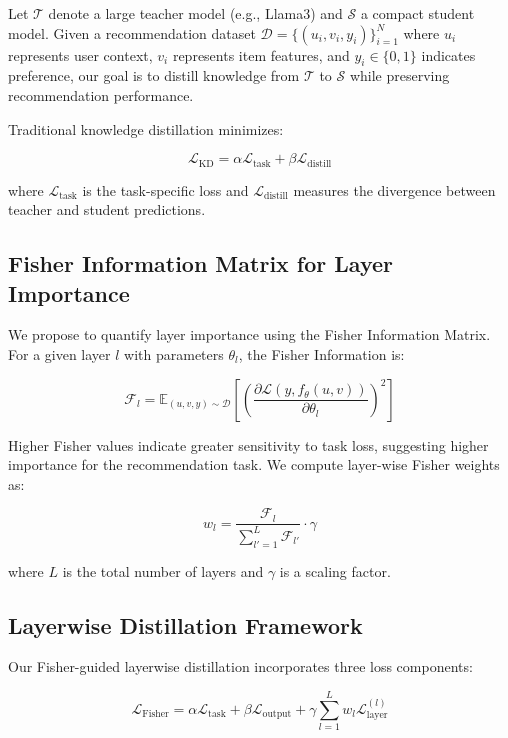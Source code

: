 \documentclass[10pt,conference]{IEEEtran}
\newcommand{\fisher}{\mathcal{F}}
\newcommand{\loss}{\mathcal{L}}
\newcommand{\student}{\mathcal{S}}
\newcommand{\teacher}{\mathcal{T}}
\begin{document}
Let $\teacher$ denote a large teacher model (e.g., Llama3) and $\student$ a compact student model. Given a recommendation dataset $\mathcal{D} = \{(u_i, v_i, y_i)\}_{i=1}^N$ where $u_i$ represents user context, $v_i$ represents item features, and $y_i \in \{0,1\}$ indicates preference, our goal is to distill knowledge from $\teacher$ to $\student$ while preserving recommendation performance.

Traditional knowledge distillation minimizes:

\begin{equation}
\loss_{\text{KD}} = \alpha \loss_{\text{task}} + \beta \loss_{\text{distill}}
\end{equation}

where $\loss_{\text{task}}$ is the task-specific loss and $\loss_{\text{distill}}$ measures the divergence between teacher and student predictions.

\subsection{Fisher Information Matrix for Layer Importance}

We propose to quantify layer importance using the Fisher Information Matrix. For a given layer $l$ with parameters $\theta_l$, the Fisher Information is:

\begin{equation}
\fisher_l = \mathbb{E}_{(u,v,y) \sim \mathcal{D}}\left[\left(\frac{\partial \loss(y, f_{\theta}(u,v))}{\partial \theta_l}\right)^2\right]
\end{equation}

Higher Fisher values indicate greater sensitivity to task loss, suggesting higher importance for the recommendation task. We compute layer-wise Fisher weights as:

\begin{equation}
w_l = \frac{\fisher_l}{\sum_{l'=1}^L \fisher_{l'}} \cdot \gamma
\end{equation}

where $L$ is the total number of layers and $\gamma$ is a scaling factor.

\subsection{Layerwise Distillation Framework}

Our Fisher-guided layerwise distillation incorporates three loss components:

\begin{equation}
\loss_{\text{Fisher}} = \alpha \loss_{\text{task}} + \beta \loss_{\text{output}} + \gamma \sum_{l=1}^L w_l \loss_{\text{layer}}^{(l)}
\end{equation}
\end{document}
